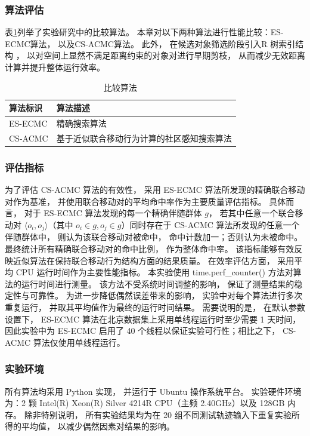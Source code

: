\subsubsection*{算法评估}
表\ref{cm_tab:compared_alg}列举了实验研究中的比较算法。
本章对以下两种算法进行性能比较：ES-ECMC算法， 以及CS-ACMC算法。
此外， 在候选对象筛选阶段引入R 树索引结构 ， 以对空间上显然不满足距离约束的对象对进行早期剪枝， 从而减少无效距离计算并提升整体运行效率。
\begin{table}[!ht]
    \caption{比较算法}\label{cm_tab:compared_alg}
    \begin{tabular}{ll}
        \toprule
		\bfseries 算法标识 & \bfseries 算法描述 \\
        \midrule
        ES-ECMC & 精确搜索算法\\
        CS-ACMC & 基于近似联合移动行为计算的社区感知搜索算法 \\
        \bottomrule
    \end{tabular}
\end{table}



\subsubsection*{评估指标}

为了评估 CS-ACMC 算法的有效性， 采用 ES-ECMC 算法所发现的精确联合移动对作为基准， 并使用联合移动对的平均命中率作为主要质量评估指标。 具体而言， 对于 ES-ECMC 算法发现的每一个精确伴随群体 $g$， 若其中任意一个联合移动对 $\langle o_i,o_j\rangle$（其中 $o_i\in g, o_j\in g$）同时存在于 CS-ACMC 算法所发现的任意一个伴随群体中， 则认为该联合移动对被命中， 命中计数加一；否则认为未被命中。 最终统计所有精确联合移动对的命中比例， 作为整体命中率。 该指标能够有效反映近似算法在保持联合移动行为结构方面的结果质量。 在效率评估方面， 采用平均 CPU 运行时间作为主要性能指标。 本实验使用 time.perf\_counter() 方法对算法的运行时间进行测量。 该方法不受系统时间调整的影响， 保证了测量结果的稳定性与可靠性。 为进一步降低偶然误差带来的影响， 实验中对每个算法进行多次重复运行， 并取其平均值作为最终的运行时间结果。 需要说明的是， 在默认参数设置下， ES-ECMC 算法在北京数据集上采用单线程运行时至少需要 1 天时间， 因此实验中为 ES-ECMC 启用了 40 个线程以保证实验可行性；相比之下， CS-ACMC 算法仅使用单线程运行。

\subsubsection*{实验环境}
所有算法均采用 Python 实现， 并运行于 Ubuntu 操作系统平台。 实验硬件环境为：2 颗 Intel(R) Xeon(R) Silver 4214R CPU（主频 2.40GHz）以及 128GB 内存。 除非特别说明， 所有实验结果均为在 20 组不同测试轨迹输入下重复实验所得的平均值， 以减少偶然因素对结果的影响。

